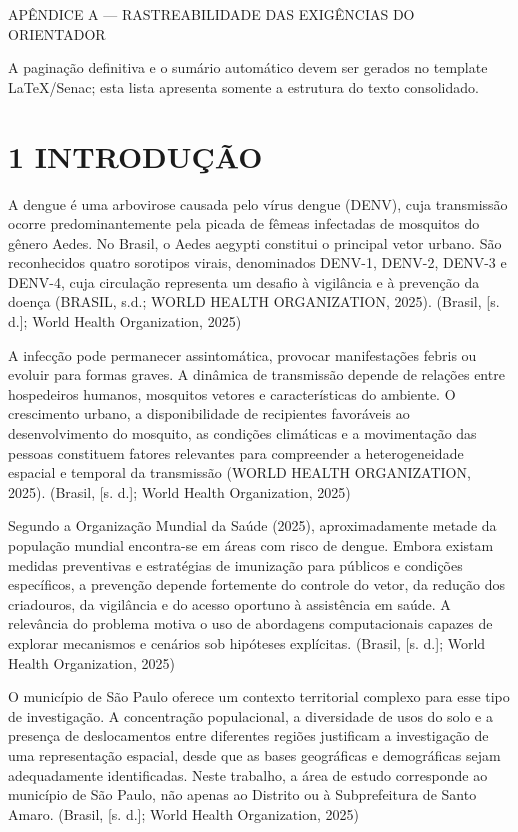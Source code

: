 APÊNDICE A --- RASTREABILIDADE DAS EXIGÊNCIAS DO ORIENTADOR

A paginação definitiva e o sumário automático devem ser gerados no
template LaTeX/Senac; esta lista apresenta somente a estrutura do texto
consolidado.

\section{1 INTRODUÇÃO}\label{introduuxe7uxe3o}

A dengue é uma arbovirose causada pelo vírus dengue (DENV), cuja
transmissão ocorre predominantemente pela picada de fêmeas infectadas de
mosquitos do gênero Aedes. No Brasil, o Aedes aegypti constitui o
principal vetor urbano. São reconhecidos quatro sorotipos virais,
denominados DENV-1, DENV-2, DENV-3 e DENV-4, cuja circulação representa
um desafio à vigilância e à prevenção da doença (BRASIL, s.d.; WORLD
HEALTH ORGANIZATION, 2025). (Brasil, {[}s. d.{]}; World Health
Organization, 2025)

A infecção pode permanecer assintomática, provocar manifestações febris
ou evoluir para formas graves. A dinâmica de transmissão depende de
relações entre hospedeiros humanos, mosquitos vetores e características
do ambiente. O crescimento urbano, a disponibilidade de recipientes
favoráveis ao desenvolvimento do mosquito, as condições climáticas e a
movimentação das pessoas constituem fatores relevantes para compreender
a heterogeneidade espacial e temporal da transmissão (WORLD HEALTH
ORGANIZATION, 2025). (Brasil, {[}s. d.{]}; World Health Organization,
2025)

Segundo a Organização Mundial da Saúde (2025), aproximadamente metade da
população mundial encontra-se em áreas com risco de dengue. Embora
existam medidas preventivas e estratégias de imunização para públicos e
condições específicos, a prevenção depende fortemente do controle do
vetor, da redução dos criadouros, da vigilância e do acesso oportuno à
assistência em saúde. A relevância do problema motiva o uso de
abordagens computacionais capazes de explorar mecanismos e cenários sob
hipóteses explícitas. (Brasil, {[}s. d.{]}; World Health Organization,
2025)

O município de São Paulo oferece um contexto territorial complexo para
esse tipo de investigação. A concentração populacional, a diversidade de
usos do solo e a presença de deslocamentos entre diferentes regiões
justificam a investigação de uma representação espacial, desde que as
bases geográficas e demográficas sejam adequadamente identificadas.
Neste trabalho, a área de estudo corresponde ao município de São Paulo,
não apenas ao Distrito ou à Subprefeitura de Santo Amaro. (Brasil, {[}s.
d.{]}; World Health Organization, 2025)

